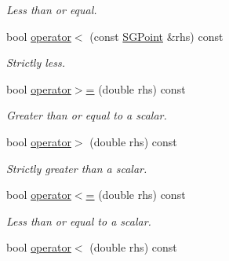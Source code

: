 \begin{DoxyCompactItemize}
\begin{DoxyCompactList}\small\item\em Less than or equal. \end{DoxyCompactList}\item 
\hypertarget{class_s_g_point_af4baa20da0c4a8524967140e2eb44497}{bool \hyperlink{class_s_g_point_af4baa20da0c4a8524967140e2eb44497}{operator$<$} (const \hyperlink{class_s_g_point}{S\+G\+Point} \&rhs) const }\label{class_s_g_point_af4baa20da0c4a8524967140e2eb44497}

\begin{DoxyCompactList}\small\item\em Strictly less. \end{DoxyCompactList}\item 
\hypertarget{class_s_g_point_a72c9a64d7ab038f5ca190cb5e433477f}{bool \hyperlink{class_s_g_point_a72c9a64d7ab038f5ca190cb5e433477f}{operator$>$=} (double rhs) const }\label{class_s_g_point_a72c9a64d7ab038f5ca190cb5e433477f}

\begin{DoxyCompactList}\small\item\em Greater than or equal to a scalar. \end{DoxyCompactList}\item 
\hypertarget{class_s_g_point_a21fe5672c770edc189bb86fcdde5c66d}{bool \hyperlink{class_s_g_point_a21fe5672c770edc189bb86fcdde5c66d}{operator$>$} (double rhs) const }\label{class_s_g_point_a21fe5672c770edc189bb86fcdde5c66d}

\begin{DoxyCompactList}\small\item\em Strictly greater than a scalar. \end{DoxyCompactList}\item 
\hypertarget{class_s_g_point_a384afaac3364f0700cbdd4ea57f3a266}{bool \hyperlink{class_s_g_point_a384afaac3364f0700cbdd4ea57f3a266}{operator$<$=} (double rhs) const }\label{class_s_g_point_a384afaac3364f0700cbdd4ea57f3a266}

\begin{DoxyCompactList}\small\item\em Less than or equal to a scalar. \end{DoxyCompactList}\item 
\hypertarget{class_s_g_point_a47fbe85777b1e972ede0d239d163b07b}{bool \hyperlink{class_s_g_point_a47fbe85777b1e972ede0d239d163b07b}{operator$<$} (double rhs) const }\label{class_s_g_point_a47fbe85777b1e972ede0d239d163b07b}


\end{DoxyCompactItemize}
